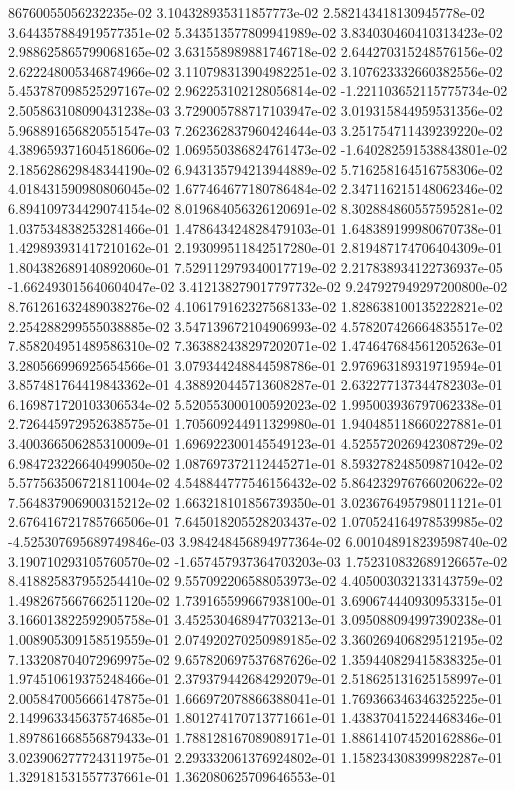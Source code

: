 86760055056232235e-02	3.104328935311857773e-02	2.582143418130945778e-02	3.644357884919577351e-02	5.343513577809941989e-02	3.834030460410313423e-02	2.988625865799068165e-02	3.631558989881746718e-02	2.644270315248576156e-02	2.622248005346874966e-02	3.110798313904982251e-02	3.107623332660382556e-02	5.453787098525297167e-02	2.962253102128056814e-02	-1.221103652115775734e-02	2.505863108090431238e-03	3.729005788717103947e-02	3.019315844959531356e-02	5.968891656820551547e-03	7.262362837960424644e-03	3.251754711439239220e-02	4.389659371604518606e-02	1.069550386824761473e-02	-1.640282591538843801e-02	2.185628629848344190e-02	6.943135794213944889e-02	5.716258164516758306e-02	4.018431590980806045e-02	1.677464677180786484e-02	2.347116215148062346e-02	6.894109734429074154e-02	8.019684056326120691e-02	8.302884860557595281e-02	1.037534838253281466e-01	1.478643424828479103e-01	1.648389199980670738e-01	1.429893931417210162e-01	2.193099511842517280e-01	2.819487174706404309e-01	1.804382689140892060e-01	7.529112979340017719e-02	2.217838934122736937e-05	-1.662493015640604047e-02	3.412138279017797732e-02	9.247927949297200800e-02	8.761261632489038276e-02	4.106179162327568133e-02	1.828638100135222821e-02	2.254288299555038885e-02	3.547139672104906993e-02	4.578207426664835517e-02	7.858204951489586310e-02	7.363882438297202071e-02	1.474647684561205263e-01	3.280566996925654566e-01	3.079344248844598786e-01	2.976963189319719594e-01	3.857481764419843362e-01	4.388920445713608287e-01	2.632277137344782303e-01	6.169871720103306534e-02	5.520553000100592023e-02	1.995003936797062338e-01	2.726445972952638575e-01	1.705609244911329980e-01	1.940485118660227881e-01	3.400366506285310009e-01	1.696922300145549123e-01	4.525572026942308729e-02	6.984723226640499050e-02	1.087697372112445271e-01	8.593278248509871042e-02	5.577563506721811004e-02	4.548844777546156432e-02	5.864232976766020622e-02	7.564837906900315212e-02	1.663218101856739350e-01	3.023676495798011121e-01	2.676416721785766506e-01	7.645018205528203437e-02	1.070524164978539985e-02	-4.525307695689749846e-03	3.984248456894977364e-02	6.001048918239598740e-02	3.190710293105760570e-02	-1.657457937364703203e-03	1.752310832689126657e-02	8.418825837955254410e-02	9.557092206588053973e-02	4.405003032133143759e-02	1.498267566766251120e-02	1.739165599667938100e-01	3.690674440930953315e-01	3.166013822592905758e-01	3.452530468947703213e-01	3.095088094997390238e-01	1.008905309158519559e-01	2.074920270250989185e-02	3.360269406829512195e-02	7.133208704072969975e-02	9.657820697537687626e-02	1.359440829415838325e-01	1.974510619375248466e-01	2.379379442684292079e-01	2.518625131625158997e-01	2.005847005666147875e-01	1.666972078866388041e-01	1.769366346346325225e-01	2.149963345637574685e-01	1.801274170713771661e-01	1.438370415224468346e-01	1.897861668556879433e-01	1.788128167089089171e-01	1.886141074520162886e-01	3.023906277724311975e-01	2.293332061376924802e-01	1.158234308399982287e-01	1.329181531557737661e-01	1.362080625709646553e-01
